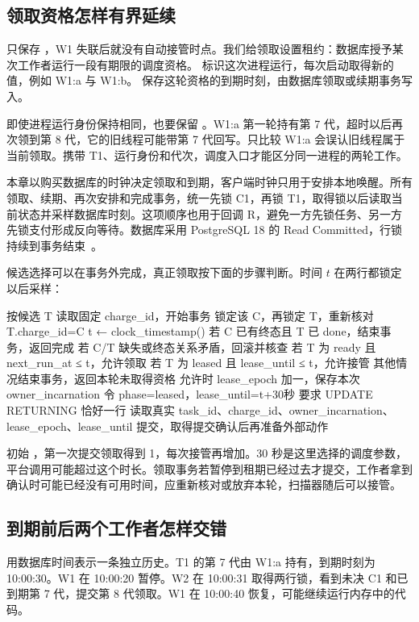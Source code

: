 \subsection*{领取资格怎样有界延续}

只保存 ，W1 失联后就没有自动接管时点。我们给领取设置租约：数据库授予某次工作者运行一段有期限的调度资格。 标识这次进程运行，每次启动取得新的值，例如 W1:a 与 W1:b。 保存这轮资格的到期时刻，由数据库领取或续期事务写入。

即使进程运行身份保持相同，也要保留 。W1:a 第一轮持有第 7 代，超时以后再次领到第 8 代，它的旧线程可能带第 7 代回写。只比较 W1:a 会误认旧线程属于当前领取。携带 T1、运行身份和代次，调度入口才能区分同一进程的两轮工作。

本章以购买数据库的时钟决定领取和到期，客户端时钟只用于安排本地唤醒。所有领取、续期、再次安排和完成事务，统一先锁 C1，再锁 T1，取得锁以后读取当前状态并采样数据库时刻。这项顺序也用于回调 R，避免一方先锁任务、另一方先锁支付形成反向等待。数据库采用 PostgreSQL 18 的 Read Committed，行锁持续到事务结束~\cite{pg}。

候选选择可以在事务外完成，真正领取按下面的步骤判断。时间 \(t\) 在两行都锁定以后采样：

\begin{BookCode}
按候选 T 读取固定 charge_id，开始事务
锁定该 C，再锁定 T，重新核对 T.charge_id=C
t ← clock_timestamp()
若 C 已有终态且 T 已 done，结束事务，返回完成
若 C/T 缺失或终态关系矛盾，回滚并核查
若 T 为 ready 且 next_run_at ≤ t，允许领取
若 T 为 leased 且 lease_until ≤ t，允许接管
其他情况结束事务，返回本轮未取得资格
允许时 lease_epoch 加一，保存本次 owner_incarnation
令 phase=leased，lease_until=t+30秒
要求 UPDATE RETURNING 恰好一行
读取真实 task_id、charge_id、owner_incarnation、lease_epoch、lease_until
提交，取得提交确认后再准备外部动作
\end{BookCode}

初始 ，第一次提交领取得到 1，每次接管再增加。30 秒是这里选择的调度参数，平台调用可能超过这个时长。领取事务若暂停到租期已经过去才提交，工作者拿到确认时可能已经没有可用时间，应重新核对或放弃本轮，扫描器随后可以接管。

\subsection*{到期前后两个工作者怎样交错}

用数据库时间表示一条独立历史。T1 的第 7 代由 W1:a 持有，到期时刻为 10:00:30。W1 在 10:00:20 暂停。W2 在 10:00:31 取得两行锁，看到未决 C1 和已到期第 7 代，提交第 8 代领取。W1 在 10:00:40 恢复，可能继续运行内存中的代码。

